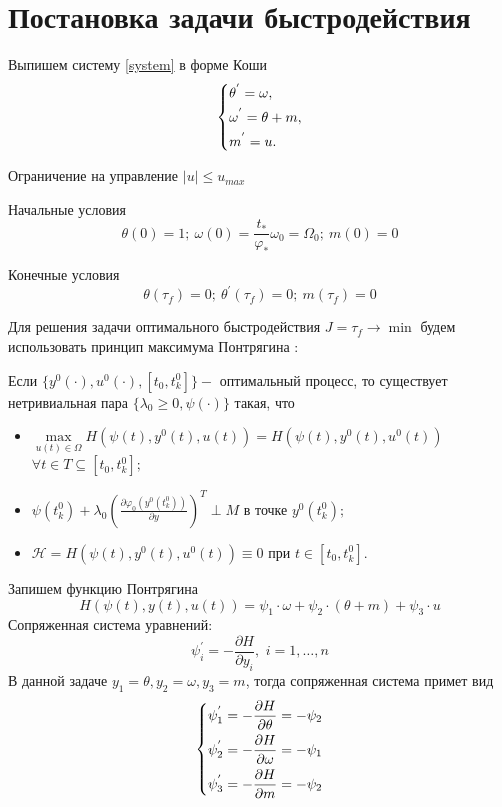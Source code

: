 \documentclass[a4paper,12pt, openany]{book}
\theoremstyle{plain} %
\theoremstyle{definition} %
\theoremstyle{remark} %
\numberwithin{equation}{chapter}
\begin{document}
{\section{Постановка задачи быстродействия}

Выпишем систему \eqref{system} в форме Коши
\begin{equation}\label{koshisystem}
    \left\{ {\begin{aligned}
                 & \theta^{'} = \omega , \hfill   \\
                 & \omega^{'} = \theta+m , \hfill \\
                 & m^{'} = u . \hfill             \\
            \end{aligned}} \right.
\end{equation}

Ограничение на управление $|u|\leqslant u_{max}$

Начальные условия
\[
    \theta(0)=1;\ \omega(0)=\frac{t_\ast}{\varphi_\ast}\omega_0=\Omega_0;\ m(0)=0
\]

Конечные условия
\[
    \theta(\tau_f)=0;\ \theta^{'}(\tau_f)=0;\ m(\tau_f)=0
\]


Для решения задачи оптимального быстродействия $J=\tau_f\to \min$ будем использовать принцип максимума Понтрягина \cite{Optimal}:

Если $\{y^0(\cdot),u^0(\cdot),[t_0,t_k^0]\} - $ оптимальный процесс, то существует нетривиальная пара $\{\lambda_0\geq0,\psi(\cdot)\}$
такая, что
\begin{itemize}
    \item $ \mathop {\max }\limits_{u(t) \in \Omega}  H(\psi(t),y^0(t),u(t))=H(\psi(t),y^0(t),u^0(t))$
          $\forall t \in T \subseteq [t_0,t_k^0];$
    \item $\psi(t_k^0)+\lambda_0(\frac{\partial \varphi_0(y^0(t_k^0))}{\partial y})^T \perp M \text{ в точке } y^0(t_k^0);$
    \item $\mathcal{H}=H(\psi(t),y^0(t),u^0(t))\equiv0 \text{ при } t \in [t_0,t_k^0].$
\end{itemize}
Запишем функцию Понтрягина
\[
    H(\psi(t),y(t),u(t))=\psi_1\cdot\omega+\psi_2\cdot(\theta+m)+\psi_3\cdot u
\]
Сопряженная система уравнений:
\[
    \psi^{'}_i  =  - \frac{{\partial H}}{{\partial y_i }},\,\,i = 1, \ldots ,n
\]
В данной задаче $y_1 = \theta, y_2 = \omega, y_3=m$, тогда сопряженная система примет вид
\begin{equation} \label{7}
    \left\{ {\begin{aligned}
                 & \psi^{'}_1=  - \frac{{\partial H}}{{\partial \theta}} = - \psi_2\hfill  \\
                 & \psi^{'}_2=  - \frac{{\partial H}}{{\partial \omega }} = - \psi_1\hfill \\
                 & \psi^{'}_3=  - \frac{{\partial H}}{{\partial m }} = - \psi_2 \hfill     \\
            \end{aligned}} \right.
\end{equation}

}
\end{document}
